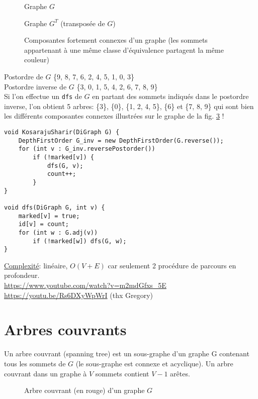 \documentclass[10pt]{article}
\begin{document}
\begin{multicols}{2}
\begin{figure}[H]
\caption{Graphe $G$}
\label{fig:cfc_start}
\end{figure}
\begin{figure}[H]
\caption{Graphe $G^T$ (transposée de $G$)}
\label{fig:cfc_inverse}
\end{figure}
\end{multicols}
\begin{figure}[H]
\caption{Composantes fortement connexes d'un graphe (les sommets appartenant à une même classe d'équivalence partagent la même couleur)}
\label{fig:cfc}
\end{figure}
Postordre de $G$ \{9, 8, 7, 6, 2, 4, 5, 1, 0, 3\}\\
Postordre inverse de $G$ \{3, 0, 1, 5, 4, 2, 6, 7, 8, 9\}\\
Si l'on effectue un \verb|dfs| de $G$ en partant des sommets indiqués dans le postordre inverse, l'on obtient 5 arbres: \{3\}, \{0\}, \{1, 2, 4, 5\}, \{6\} et \{7, 8, 9\} qui sont bien les différents composantes connexes illustrées sur le graphe de la fig. \ref{fig:cfc} !

\begin{verbatim}
void KosarajuSharir(DiGraph G) {
	DepthFirstOrder G_inv = new DepthFirstOrder(G.reverse());
	for (int v : G_inv.reversePostorder())
		if (!marked[v]) {
			dfs(G, v);
			count++;
		}
}

void dfs(DiGraph G, int v) {
	marked[v] = true;
	id[v] = count;
	for (int w : G.adj(v))
		if (!marked[w]) dfs(G, w);
}

\end{verbatim}
\underline{Complexité}: linéaire, $O(V +E)$ car seulement 2 procédure de parcours en profondeur.
\\\url{https://www.youtube.com/watch?v=m2mdGfxs_5E}
\\\url{https://youtu.be/Rs6DXyWpWrI} (thx Gregory)
\section{Arbres couvrants}
Un arbre couvrant (spanning tree) est un sous-graphe d'un graphe G contenant tous les sommets de $G$ (le sous-graphe est connexe et acyclique). Un arbre couvrant dans un graphe à $V$ sommets contient $V-1$ arêtes.
\begin{figure}[H]
\caption{Arbre couvrant (en rouge) d'un graphe $G$}
\label{fig:cfc_inverse}
\end{figure}
\end{document}
